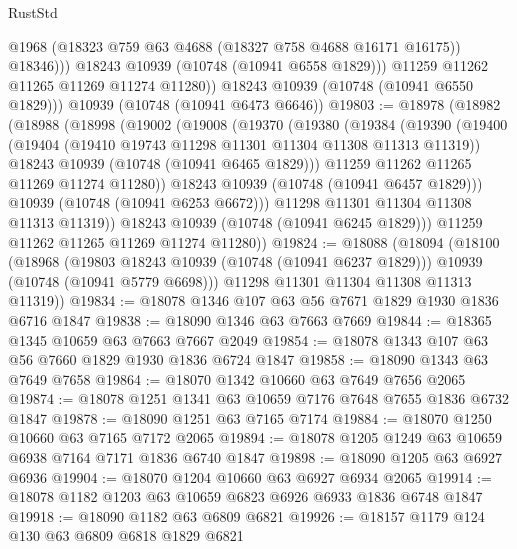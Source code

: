 \begin{lexlean}{RustStd}
\begin{coremodule}
                  @1968
                  (@18323 @759 @63 @4688 (@18327 @758 @4688 @16171 @16175))
                  @18346)))
            @18243
            @10939
            (@10748 (@10941 @6558 @1829)))
          @11259
          @11262
          @11265
          @11269
          @11274
          @11280))
      @18243
      @10939
      (@10748 (@10941 @6550 @1829)))
    @10939
    (@10748 (@10941 @6473 @6646))
@19803 := @18978
    (@18982
      (@18988
        (@18998
          (@19002
            (@19008
              (@19370
                (@19380
                  (@19384
                    (@19390
                      (@19400
                        (@19404 (@19410 @19743 @11298 @11301 @11304 @11308 @11313 @11319))
                        @18243
                        @10939
                        (@10748 (@10941 @6465 @1829)))
                      @11259
                      @11262
                      @11265
                      @11269
                      @11274
                      @11280))
                  @18243
                  @10939
                  (@10748 (@10941 @6457 @1829)))
                @10939
                (@10748 (@10941 @6253 @6672)))
              @11298
              @11301
              @11304
              @11308
              @11313
              @11319))
          @18243
          @10939
          (@10748 (@10941 @6245 @1829)))
        @11259
        @11262
        @11265
        @11269
        @11274
        @11280))
@19824 := @18088
    (@18094
      (@18100
        (@18968
          (@19803 @18243 @10939 (@10748 (@10941 @6237 @1829)))
          @10939
          (@10748 (@10941 @5779 @6698)))
        @11298
        @11301
        @11304
        @11308
        @11313
        @11319))
@19834 := @18078 @1346 @107 @63 @56 @7671 @1829 @1930 @1836 @6716 @1847
@19838 := @18090 @1346 @63 @7663 @7669
@19844 := @18365 @1345 @10659 @63 @7663 @7667 @2049
@19854 := @18078 @1343 @107 @63 @56 @7660 @1829 @1930 @1836 @6724 @1847
@19858 := @18090 @1343 @63 @7649 @7658
@19864 := @18070 @1342 @10660 @63 @7649 @7656 @2065
@19874 := @18078 @1251 @1341 @63 @10659 @7176 @7648 @7655 @1836 @6732 @1847
@19878 := @18090 @1251 @63 @7165 @7174
@19884 := @18070 @1250 @10660 @63 @7165 @7172 @2065
@19894 := @18078 @1205 @1249 @63 @10659 @6938 @7164 @7171 @1836 @6740 @1847
@19898 := @18090 @1205 @63 @6927 @6936
@19904 := @18070 @1204 @10660 @63 @6927 @6934 @2065
@19914 := @18078 @1182 @1203 @63 @10659 @6823 @6926 @6933 @1836 @6748 @1847
@19918 := @18090 @1182 @63 @6809 @6821
@19926 := @18157 @1179 @124 @130 @63 @6809 @6818 @1829 @6821

\end{coremodule}
\end{lexlean}
